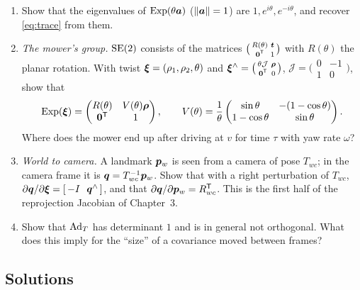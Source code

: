 \begin{enumerate}[label=\textbf{2.\arabic*},ref=2.\arabic*]
\item\label{ex:2eig} Show that the eigenvalues of $\operatorname{Exp}(\theta\bm{a})$
  ($\left\lVert \bm{a}\right\rVert=1$) are $1,e^{i\theta},e^{-i\theta}$, and recover
  \eqref{eq:trace} from them.
\item\label{ex:se2} \emph{The mower's group.} $\mathrm{SE}(2)$ consists of the
  matrices $\bigl(\begin{smallmatrix}R(\theta)&\bm{t}\\\bm{0}^{\mathsf{T}}&1
  \end{smallmatrix}\bigr)$ with $R(\theta)$ the planar rotation.
  With twist $\bm{\xi}=(\rho_1,\rho_2,\theta)$ and
  $\bm{\xi}^{\wedge}=\bigl(\begin{smallmatrix}\theta\mathcal{J}&\bm{\rho}\\
  \bm{0}^{\mathsf{T}}&0\end{smallmatrix}\bigr)$, $\mathcal{J}=\bigl(
  \begin{smallmatrix}0&-1\\1&0\end{smallmatrix}\bigr)$, show that
  \[
  \operatorname{Exp}(\bm{\xi})=\begin{pmatrix}R(\theta)&V(\theta)\bm{\rho}\\\bm{0}^{\mathsf{T}}&1
  \end{pmatrix},\qquad
  V(\theta)=\frac1\theta\begin{pmatrix}\sin\theta&-(1-\cos\theta)\\
  1-\cos\theta&\sin\theta\end{pmatrix}.
  \]
  Where does the mower end up after driving at $v$ for time $\tau$ with
  yaw rate $\omega$?
\item\label{ex:2cam} \emph{World to camera.} A landmark $\bm{p}_w$ is seen
  from a camera of pose $T_{wc}$; in the camera frame it is $\bm{q}=
  T_{wc}^{-1}\bm{p}_w$. Show that with a right perturbation of $T_{wc}$,
  $\partial\vect{q}/\partial\bxi=[\,-I\ \ \hatop{\vect{q}}\,]$, and that
  $\partial\bm{q}/\partial\bm{p}_w=R_{wc}^{\mathsf{T}}$. This is the first half of the
  reprojection Jacobian of Chapter~3.
\item\label{ex:2adj} Show that $\operatorname{Ad}_T$ has determinant $1$ and is in
  general not orthogonal. What does this imply for the ``size'' of a
  covariance moved between frames?
\end{enumerate}

\subsection*{Solutions}

